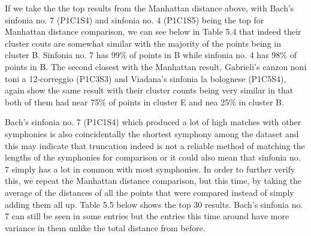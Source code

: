If we take the the top results from the Manhattan distance above, with Bach’s sinfonia no. 7 (P1C1S4) and sinfonia no. 4 (P1C1S5) being the top for Manhattan distance comparison, we can see below in Table 5.4 that indeed their cluster couts are somewhat similar with the majority of the points being in cluster B. Sinfonia no. 7 has 99\% of points in B while sinfonia no. 4 has 98\% of points in B.  The second closest with the Manhattan result, Gabrieli’s canzon noni toni a 12-correggio (P1C3S3) and Viadana’s sinfonia la bolognese (P1C5S4), again show the same result with their cluster counts being very similar in that both of them had near 75\% of points in cluster E and nea 25\% in cluster B.

Bach’s sinfonia no. 7 (P1C1S4) which produced a lot of high matches with other symphonies is also coincidentally the shortest symphony among the dataset and this may indicate that truncation indeed is not a reliable method of matching the lengths of the symphonies for comparison or it could also mean that sinfonia no. 7 simply has a lot in common with most symphonies. In order to further verify this, we repeat the Manhattan distance comparison, but this time, by taking the average of the distances of all the points that were compared instead of simply adding them all up. Table 5.5 below shows the top 30 results. Bach’s sinfonia no. 7 can still be seen in some entries but the entries this time around have more variance in them unlike the total distance from before.

